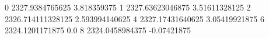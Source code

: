 0 2327.9384765625 3.818359375
1 2327.63623046875 3.51611328125
2 2326.714111328125 2.593994140625
4 2327.17431640625 3.05419921875
6 2324.1201171875 0.0
8 2324.0458984375 -0.07421875
